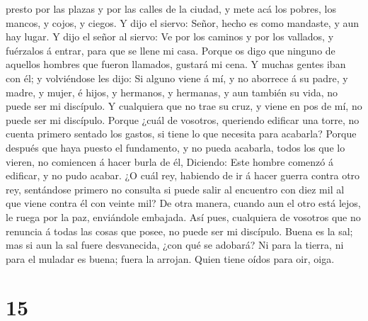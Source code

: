 presto por las plazas y por las calles de la ciudad, y mete acá los
pobres, los mancos, y cojos, y ciegos.  Y dijo el siervo:
Señor, hecho es como mandaste, y aun hay lugar.  Y dijo
el señor al siervo: Ve por los caminos y por los vallados, y fuérzalos á
entrar, para que se llene mi casa.  Porque os digo que
ninguno de aquellos hombres que fueron llamados, gustará mi cena.
 Y muchas gentes iban con él; y volviéndose les dijo:
 Si alguno viene á mí, y no aborrece á su padre, y madre,
y mujer, é hijos, y hermanos, y hermanas, y aun también su vida, no
puede ser mi discípulo.  Y cualquiera que no trae su
cruz, y viene en pos de mí, no puede ser mi discípulo. 
Porque ¿cuál de vosotros, queriendo edificar una torre, no cuenta
primero sentado los gastos, si tiene lo que necesita para acabarla?
 Porque después que haya puesto el fundamento, y no pueda
acabarla, todos los que lo vieren, no comiencen á hacer burla de él,
 Diciendo: Este hombre comenzó á edificar, y no pudo
acabar.  ¿O cuál rey, habiendo de ir á hacer guerra
contra otro rey, sentándose primero no consulta si puede salir al
encuentro con diez mil al que viene contra él con veinte mil?
 De otra manera, cuando aun el otro está lejos, le ruega
por la paz, enviándole embajada.  Así pues, cualquiera de
vosotros que no renuncia á todas las cosas que posee, no puede ser mi
discípulo.  Buena es la sal; mas si aun la sal fuere
desvanecida, ¿con qué se adobará?  Ni para la tierra, ni
para el muladar es buena; fuera la arrojan. Quien tiene oídos para oir,
oiga.

\hypertarget{section-14}{%
\section{15}\label{section-14}}

